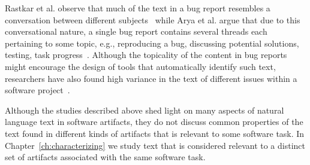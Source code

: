 Rastkar et al. observe that much of the text in a bug report resembles a 
conversation between different subjects~\cite{Rastkar2013} 
while Arya et al. argue that due to this conversational nature, 
a single bug report contains several threads each 
pertaining to some topic, e.g., 
reproducing a bug, discussing potential solutions, 
testing, task progress~\cite{Arya2019}. 
Although the topicality of the content in bug reports 
might encourage the design of tools that automatically identify such
text, researchers have also found high variance in the text of different 
issues within a software project~\cite{Chaparro2016}.



Although the studies described above shed light on many 
aspects of natural language text in software artifacts, 
they do not discuss common properties of the text 
found in different kinds of artifacts
that is relevant to some software task.
In Chapter~\ref{ch:characterizing}
we study text that is considered relevant to 
a distinct set of artifacts associated with the 
same software task.











